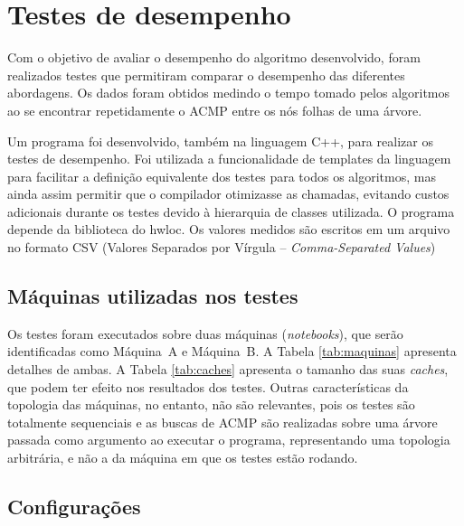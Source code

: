 
\chapter{Testes de desempenho}
\label{cap:testes}

Com o objetivo de avaliar o desempenho do algoritmo desenvolvido, foram realizados testes
que permitiram comparar o desempenho das diferentes abordagens.
Os dados foram obtidos medindo o tempo tomado pelos algoritmos
ao se encontrar repetidamente o ACMP entre os nós folhas de uma árvore.

Um programa foi desenvolvido, também na linguagem C++, para realizar os testes de desempenho.
Foi utilizada a funcionalidade de templates da linguagem para facilitar a definição equivalente dos testes para todos os algoritmos, mas ainda assim permitir que o compilador otimizasse as chamadas, evitando custos adicionais durante os testes devido à hierarquia de classes utilizada.
O programa depende da biblioteca do hwloc.
Os valores medidos são escritos em um arquivo no formato CSV (Valores Separados por Vírgula -- \textit{Comma-Separated Values})


\section{Máquinas utilizadas nos testes}

Os testes foram executados sobre duas máquinas (\textit{notebooks}), que serão identificadas como Máquina~A e Máquina~B.
A Tabela \ref{tab:maquinas} apresenta detalhes de ambas.
A Tabela \ref{tab:caches} apresenta o tamanho das suas \textit{caches}, que podem ter efeito nos resultados dos testes.
Outras características da topologia das máquinas, no entanto, não são relevantes, pois os testes são totalmente sequenciais
e as buscas de ACMP são realizadas sobre uma árvore passada como argumento ao executar o programa,
representando uma topologia arbitrária, e não a da máquina em que os testes estão rodando.




\section{Configurações}


